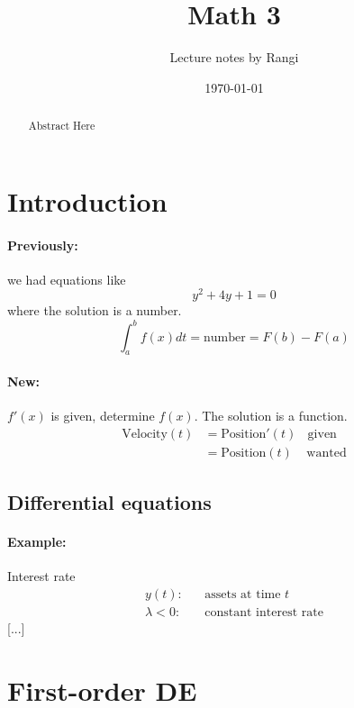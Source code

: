 \documentclass[twocolumn]{article}
\begin{document}
\title{Math 3}
\author{Lecture notes by Rangi}
\date{\today}
\maketitle

\begin{abstract}
	Abstract Here
\end{abstract}

\section{Introduction}
	\paragraph{Previously:}
	we had equations like 
	\begin{equation}
	y ^{2}+4y+1=0 
	\end{equation}
	where the solution is a number.
	\begin{equation}
		\int_{a}^{b} f(x) dt = \text{number} = F(b)-F(a)	
	\end{equation}
	\paragraph{New:}
	$ f'(x) $ is given, determine $ f(x) $. The solution is a function.
	\begin{equation}
		\begin{split}
			\text{Velocity}(t) & = \text{Position}'(t)~~~~  \text{given}  \\
					   & = \text{Position}(t)~~~~~  \text{wanted}
		\end{split}
	\end{equation}
	\subsection{Differential equations}
	\paragraph{Example:}
	Interest rate
	\begin{equation}
	\begin{split}
		y(t):~~~~ & \text{assets at time }t \\
		\lambda<0:~~~~ & \text{constant interest rate}
	\end{split}
	\end{equation}
	[...]
	
	
\section{First-order DE}
\end{document}
